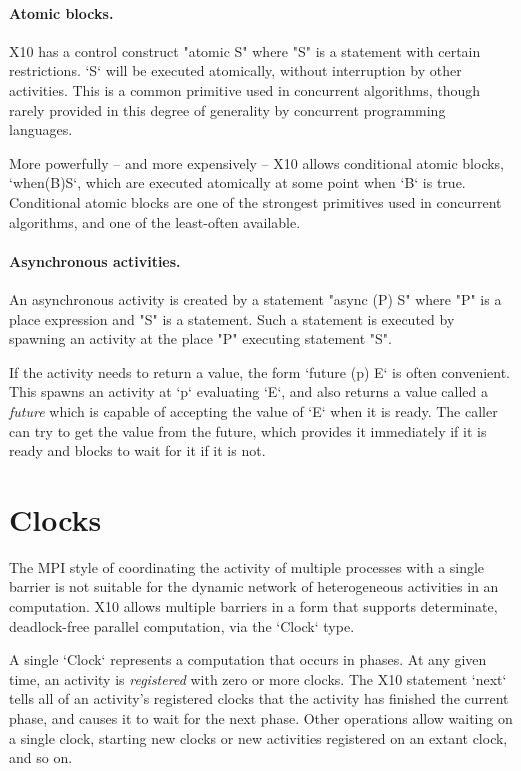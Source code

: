 \paragraph{Atomic blocks.}

X10 has a control construct \xcd"atomic S" where \xcd"S" is a statement with
certain restrictions. \xcd`S` will be executed atomically, without
interruption by other activities. This is a common primitive used in
concurrent algorithms, though rarely provided in this degree of generality by
concurrent programming languages.

More powerfully -- and more expensively -- X10 allows conditional atomic
blocks, \xcd`when(B)S`, which are executed atomically at some point when
\xcd`B` is true.  Conditional atomic blocks are one of the strongest
primitives used in concurrent algorithms, and one of the least-often
available. 

\paragraph{Asynchronous activities.}

An asynchronous activity is created by a statement \xcd"async (P) S"
where \xcd"P" is a place expression and \xcd"S" is a statement.  Such
a statement is executed by spawning an activity at the place
\xcd"P"  executing statement \xcd"S".

If the activity needs to return a value, the form \xcd`future (p) E` is often
convenient. This spawns an activity at \xcd`p` evaluating \xcd`E`, and also
returns a value called a {\em future} which is capable of accepting the value
of \xcd`E` when it is ready.  The caller can try to get the value from the
future, which provides it immediately if it is ready and blocks to wait for it
if it is not.



\section{Clocks}
The MPI style of coordinating the activity of multiple processes with
a single barrier is not suitable for the dynamic network of heterogeneous
activities in an \Xten{} computation.  
X10 allows multiple barriers in a form that supports determinate,
deadlock-free parallel computation, via the \xcd`Clock` type.

A single \xcd`Clock` represents a computation that occurs in phases.
At any given time, an activity is {\em registered} with zero or more clocks.
The X10 statement \xcd`next` tells all of an activity's registered clocks that
the activity has finished the current phase, and causes it to wait for the
next phase.  Other operations allow waiting on a single clock, starting
new clocks or new activities registered on an extant clock, and so on. 

